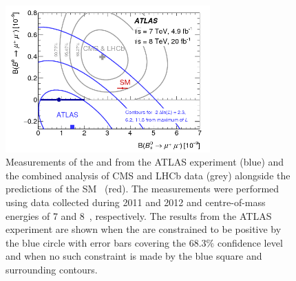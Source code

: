 \begin{figure}[tbp]
    \centering
        \includegraphics[width=0.7\textwidth]{./Figs/Introduction/contour_plot.png}
        \caption{Measurements of the \bdmumu \BF and \bsmumu \BF from the ATLAS experiment (blue) and the combined analysis of CMS and LHCb data (grey) alongside the predictions of the SM~\cite{Aaboud:2016ire} (red). The measurements were performed using data collected during 2011 and 2012 and centre-of-mass energies of 7 and 8~\tev, respectively. The results from the ATLAS experiment are shown when the \BFs are constrained to be positive by the blue circle with error bars covering the 68.3$\%$ confidence level and when no such constraint is made by the blue square and surrounding contours.}
        \label{fig:atlasCMSLHCbcomparison}
\end{figure}

